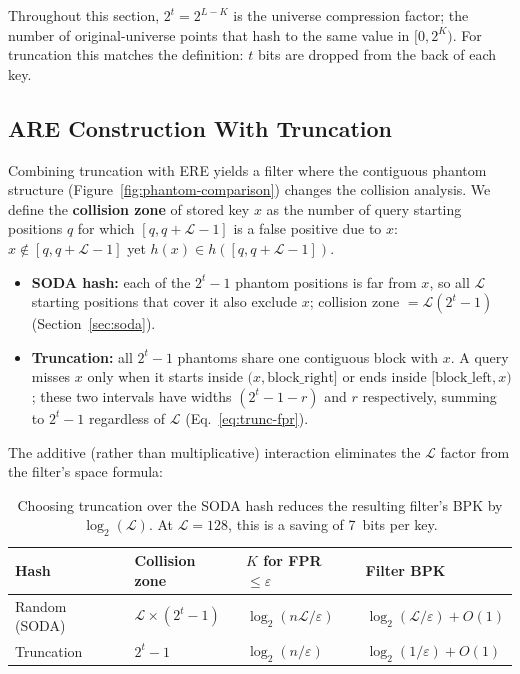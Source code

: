 \begin{remark}
    Throughout this section, $2^t = 2^{L - K}$ is the universe compression factor; the number of
    original-universe points that hash to the same value in $[0, 2^K)$.
    For truncation this matches the definition: $t$ bits are dropped from the back of each key.
\end{remark}

\subsection{ARE Construction With Truncation}

Combining truncation with ERE yields a filter where the contiguous phantom structure
(Figure~\ref{fig:phantom-comparison}) changes the collision analysis.
We define the \textbf{collision zone} of stored key $x$ as the number of query starting
positions $q$ for which $[q, q+\mathcal{L}-1]$ is a false positive due to $x$:
$x \notin [q, q+\mathcal{L}-1]$ yet $h(x) \in h([q, q+\mathcal{L}-1])$.

\begin{itemize}
    \item \textbf{SODA hash:} each of the $2^t - 1$ phantom positions is far from $x$,
    so all $\mathcal{L}$ starting positions that cover it also exclude $x$;
    collision zone $= \mathcal{L}(2^t - 1)$ (Section~\ref{sec:soda}).
    \item \textbf{Truncation:} all $2^t - 1$ phantoms share one contiguous block with $x$.
    A query misses $x$ only when it starts inside $(x, \text{block\_right}]$ or ends
    inside $[\text{block\_left}, x)$; these two intervals have widths $(2^t - 1 - r)$
    and $r$ respectively, summing to $2^t - 1$ regardless of $\mathcal{L}$
    (Eq.~\eqref{eq:trunc-fpr}).
\end{itemize}

The additive (rather than multiplicative) interaction eliminates the $\mathcal{L}$
factor from the filter's space formula:

\begin{table}[H]
    \centering
    \begin{tabular}{@{}llll@{}}
        \toprule
        Hash & Collision zone & $K$ for FPR $\leq \varepsilon$ & Filter BPK \\
        \midrule
        Random (SODA) & $\mathcal{L} \times (2^t-1)$ & $\log_2(n\mathcal{L}/\varepsilon)$ &
        $\log_2(\mathcal{L}/\varepsilon) + O(1)$ \\
        Truncation & $2^t - 1$ & $\log_2(n/\varepsilon)$ &
        $\log_2(1/\varepsilon) + O(1)$ \\
        \bottomrule
    \end{tabular}
    \caption{Choosing truncation over the SODA hash reduces the resulting filter's BPK by
        $\log_2(\mathcal{L})$. At $\mathcal{L} = 128$, this is a saving of 7~bits per key.}
    \label{tab:trunc-vs-soda}
\end{table}

